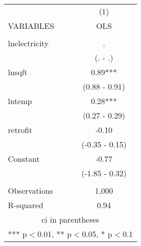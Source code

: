 \begin{tabular}{lc} \hline
 & (1) \\
VARIABLES & OLS \\ \hline
 &  \\
lnelectricity & . \\
 & (. - .) \\
lnsqft & 0.89*** \\
 & (0.88 - 0.91) \\
lntemp & 0.28*** \\
 & (0.27 - 0.29) \\
retrofit & -0.10 \\
 & (-0.35 - 0.15) \\
Constant & -0.77 \\
 & (-1.85 - 0.32) \\
 &  \\
Observations & 1,000 \\
 R-squared & 0.94 \\ \hline
\multicolumn{2}{c}{ ci in parentheses} \\
\multicolumn{2}{c}{ *** p$<$0.01, ** p$<$0.05, * p$<$0.1} \\
\end{tabular}
